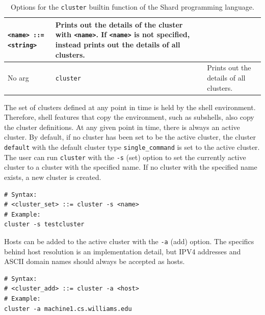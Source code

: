 \documentclass[twoside]{report}
\begin{document}
\begin{table}
\begin{center}
\begin{tabularx}{\textwidth}{|l|X|X|}
      \texttt{<name> ::= <string>}  & Prints out the details of the cluster with \texttt{<name>}. If \texttt{<name>} is not specified, instead prints out the details of all clusters.
      \\ \hline
      No arg                        & \texttt{cluster}                                                                                                                                                                             & Prints out the details of all clusters.
      \\ \hline
    \end{tabularx}
    \caption{Options for the \texttt{cluster} builtin function of the Shard programming language.}
    \label{fig:pl_cluster_options}
  \end{center}
\end{table}

The set of clusters defined at any point in time is held by the shell environment.
Therefore, shell features that copy the environment, such as subshells, also copy the cluster definitions.
At any given point in time, there is always an active cluster.
By default, if no cluster has been set to be the active cluster, the cluster \texttt{default} with the default cluster type \texttt{single\_command} is set to the active cluster.
The user can run \texttt{cluster} with the \texttt{-s} (set) option to set the currently active cluster to a cluster with the specified name.
If no cluster with the specified name exists, a new cluster is created.

\begin{minipage}[c]{\textwidth-15pt}
  \begin{lstlisting}[language=Shard]
# Syntax:
# <cluster_set> ::= cluster -s <name>
# Example:
cluster -s testcluster
\end{lstlisting}
  \smallskip
\end{minipage}

Hosts can be added to the active cluster with the \texttt{-a} (add) option.
The specifics behind host resolution is an implementation detail, but IPV4 addresses and ASCII domain names should always be accepted as hosts.

\begin{minipage}[c]{\textwidth-15pt}
  \begin{lstlisting}[language=Shard]
# Syntax:
# <cluster_add> ::= cluster -a <host>
# Example:
cluster -a machine1.cs.williams.edu
\end{lstlisting}
  \smallskip
\end{minipage}
\end{document}
